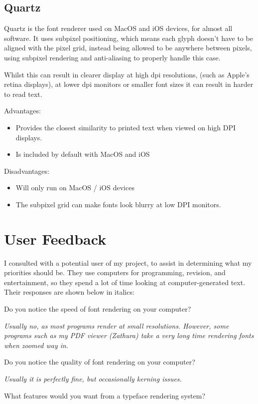 \documentclass{report}
\begin{document}
\subsection{Quartz}
Quartz is the font renderer used on MacOS and iOS devices, for almost all
software. It uses subpixel positioning, which means each glyph doesn't have to
be aligned with the pixel grid, instead being allowed to be anywhere between
pixels, using subpixel rendering and anti-aliasing to properly handle this
case.

Whilst this can result in clearer display at high dpi resolutions, (such as
Apple's retina displays), at lower dpi monitors or smaller font sizes it can
result in harder to read text.

Advantages:
\begin{itemize}
  \item{Provides the closest similarity to printed text when viewed on high DPI
      displays. }
  \item{Is included by default with MacOS and iOS}
\end{itemize}

Disadvantages:
\begin{itemize}
\item{Will only run on MacOS / iOS devices}
\item{The subpixel grid can make fonts look blurry at low DPI monitors.}
\end{itemize}

\section{User Feedback}

I consulted with a potential user of my project, to assist in determining what
my priorities should be. They use computers for programming, revision, and
entertainment, so they spend a lot of time looking at computer-generated text.
Their responses are shown below in italics:

Do you notice the speed of font rendering on your computer?

\textit{Usually no, as most programs render at small resolutions. However, some
  programs such as my PDF viewer (Zathura) take a very long time rendering fonts
  when zoomed way in.}

Do you notice the quality of font rendering on your computer?

\textit{Usually it is perfectly fine, but occasionally kerning issues.}

What features would you want from a typeface rendering system?
\end{document}

